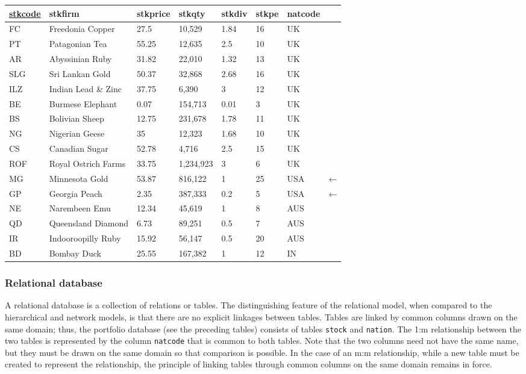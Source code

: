\documentclass[
]{article}
\begin{document}
\begin{longtable}[]{@{}llllllll@{}}
\toprule
\underline{stkcode} & stkfirm & stkprice & stkqty & stkdiv & stkpe & natcode & \\
\midrule
\endhead
FC & Freedonia Copper & 27.5 & 10,529 & 1.84 & 16 & UK & \\
PT & Patagonian Tea & 55.25 & 12,635 & 2.5 & 10 & UK & \\
AR & Abyssinian Ruby & 31.82 & 22,010 & 1.32 & 13 & UK & \\
SLG & Sri Lankan Gold & 50.37 & 32,868 & 2.68 & 16 & UK & \\
ILZ & Indian Lead \& Zinc & 37.75 & 6,390 & 3 & 12 & UK & \\
BE & Burmese Elephant & 0.07 & 154,713 & 0.01 & 3 & UK & \\
BS & Bolivian Sheep & 12.75 & 231,678 & 1.78 & 11 & UK & \\
NG & Nigerian Geese & 35 & 12,323 & 1.68 & 10 & UK & \\
CS & Canadian Sugar & 52.78 & 4,716 & 2.5 & 15 & UK & \\
ROF & Royal Ostrich Farms & 33.75 & 1,234,923 & 3 & 6 & UK & \\
MG & Minnesota Gold & 53.87 & 816,122 & 1 & 25 & USA & ← \\
GP & Georgia Peach & 2.35 & 387,333 & 0.2 & 5 & USA & ← \\
NE & Narembeen Emu & 12.34 & 45,619 & 1 & 8 & AUS & \\
QD & Queensland Diamond & 6.73 & 89,251 & 0.5 & 7 & AUS & \\
IR & Indooroopilly Ruby & 15.92 & 56,147 & 0.5 & 20 & AUS & \\
BD & Bombay Duck & 25.55 & 167,382 & 1 & 12 & IN & \\
\bottomrule
\end{longtable}

\hypertarget{relational-database}{%
\subsubsection*{Relational database}\label{relational-database}}

A relational database is a collection of relations or tables. The
distinguishing feature of the relational model, when compared to the
hierarchical and network models, is that there are no explicit linkages
between tables. Tables are linked by common columns drawn on the same
domain; thus, the portfolio database (see the preceding tables) consists
of tables \texttt{stock} and \texttt{nation}. The 1:m relationship between the two
tables is represented by the column \texttt{natcode} that is common to both
tables. Note that the two columns need not have the same name, but they
must be drawn on the same domain so that comparison is possible. In the
case of an m:m relationship, while a new table must be created to
represent the relationship, the principle of linking tables through
common columns on the same domain remains in force.
\end{document}
